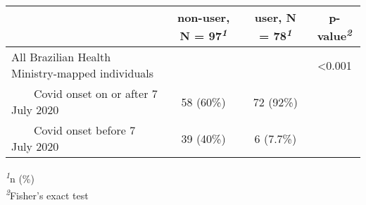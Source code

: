 \setlength{\LTpost}{0mm}
\begin{longtable}{lccc}
\toprule
 & \textbf{non-user}, N = 97\textsuperscript{\textit{1}} & \textbf{user}, N = 78\textsuperscript{\textit{1}} & \textbf{p-value}\textsuperscript{\textit{2}} \\ 
\midrule
All Brazilian Health Ministry-mapped individuals &  &  & <0.001 \\ 
    Covid onset on or after 7 July 2020 & 58 (60\%) & 72 (92\%) &  \\ 
    Covid onset before 7 July 2020 & 39 (40\%) & 6 (7.7\%) &  \\ 
\bottomrule
\end{longtable}
\begin{minipage}{\linewidth}
\textsuperscript{\textit{1}}n (\%)\\
\textsuperscript{\textit{2}}Fisher's exact test\\
\end{minipage}

